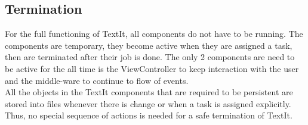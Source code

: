 \subsection{Termination}
For the full functioning of TextIt, all components do not have to be running. The components are temporary, they become active when they are assigned a task, then are terminated after their job is done. The only 2 components are need to be active for the all time is the ViewController to keep interaction with the user and the middle-ware to continue to flow of events. \\

All the objects in the TextIt components that are required to be persistent are stored into files whenever there is change or when a task is assigned explicitly. Thus, no special sequence of actions is needed for a safe termination of TextIt.



